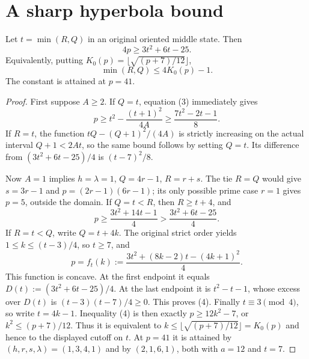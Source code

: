 \section{A sharp hyperbola bound}
\begin{theorem}
Let $t=\min(R,Q)$ in an original oriented middle state. Then
\[
 \boxed{4p\ge3t^2+6t-25.}                                \tag{4}
\]
Equivalently, putting $K_0(p)=\lfloor\sqrt{(p+7)/12}\rfloor$,
\[
 \min(R,Q)\le4K_0(p)-1.
\]
The constant is attained at $p=41$.
\end{theorem}
\begin{proof}
First suppose $A\ge2$. If $Q=t$, equation (3) immediately gives
\[
 p\ge t^2-\frac{(t+1)^2}{4A}\ge\frac{7t^2-2t-1}{8}.
\]
If $R=t$, the function $tQ-(Q+1)^2/(4A)$ is strictly increasing on the
actual interval $Q+1<2At$, so the same bound follows by setting $Q=t$.
Its difference from $(3t^2+6t-25)/4$ is $(t-7)^2/8$.

Now $A=1$ implies $h=\lambda=1$, $Q=4r-1$, $R=r+s$. The tie $R=Q$
would give $s=3r-1$ and $p=(2r-1)(6r-1)$; its only possible prime case
$r=1$ gives $p=5$, outside the domain. If $Q=t<R$, then $R\ge t+4$, and
\[
 p\ge\frac{3t^2+14t-1}{4}>\frac{3t^2+6t-25}{4}.
\]
If $R=t<Q$, write $Q=t+4k$. The original strict order yields
$1\le k\le(t-3)/4$, so $t\ge7$, and
\[
 p=f_t(k):=\frac{3t^2+(8k-2)t-(4k+1)^2}{4}.             \tag{5}
\]
This function is concave. At the first endpoint it equals
$D(t):=(3t^2+6t-25)/4$. At the last endpoint it is $t^2-t-1$, whose
excess over $D(t)$ is $(t-3)(t-7)/4\ge0$. This proves (4). Finally
$t\equiv3\pmod4$, so write $t=4k-1$. Inequality (4) is then exactly
$p\ge12k^2-7$, or $k^2\le(p+7)/12$. Thus it is equivalent to
$k\le\lfloor\sqrt{(p+7)/12}\rfloor=K_0(p)$ and hence to the displayed
cutoff on $t$.
At $p=41$ it is attained by $(h,r,s,\lambda)=(1,3,4,1)$ and by
$(2,1,6,1)$, both with $a=12$ and $t=7$.
\end{proof}

